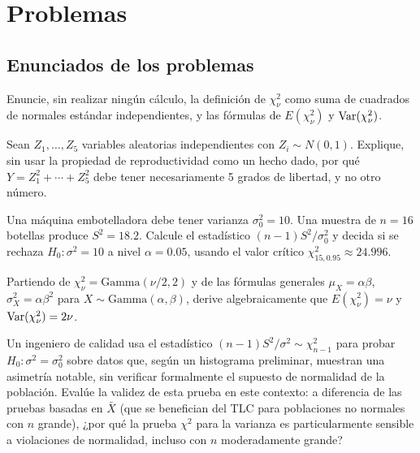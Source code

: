 \section*{Problemas}

\subsection*{Enunciados de los problemas}

\begin{problema}
	\label{prob:0d114e5}
	Enuncie, sin realizar ningún cálculo, la definición de $\chi^2_\nu$ como suma de cuadrados de normales estándar independientes, y las fórmulas de $E(\chi^2_\nu)$ y $\operatorname{Var}(\chi^2_\nu)$.
\end{problema}

\begin{problema}
	\label{prob:66b286b}
	Sean $Z_1,\ldots,Z_5$ variables aleatorias independientes con $Z_i\sim N(0,1)$. Explique, sin usar la propiedad de reproductividad como un hecho dado, por qué $Y=Z_1^2+\cdots+Z_5^2$ debe tener necesariamente 5 grados de libertad, y no otro número.
\end{problema}

\begin{problema}
	\label{prob:94c69e2}
	Una máquina embotelladora debe tener varianza $\sigma_0^2=10$. Una muestra de $n=16$ botellas produce $S^2=18.2$. Calcule el estadístico $(n-1)S^2/\sigma_0^2$ y decida si se rechaza $H_0:\sigma^2=10$ a nivel $\alpha=0.05$, usando el valor crítico $\chi^2_{15,0.95}\approx24.996$.
\end{problema}

\begin{problema}
	\label{prob:b08d077}
	Partiendo de $\chi^2_\nu = \text{Gamma}(\nu/2,2)$ y de las fórmulas generales $\mu_X=\alpha\beta$, $\sigma_X^2=\alpha\beta^2$ para $X\sim\text{Gamma}(\alpha,\beta)$, derive algebraicamente que $E(\chi^2_\nu)=\nu$ y $\operatorname{Var}(\chi^2_\nu)=2\nu$.
\end{problema}

\begin{problema}
	\label{prob:db05590}
	Un ingeniero de calidad usa el estadístico $(n-1)S^2/\sigma^2 \sim \chi^2_{n-1}$ para probar $H_0:\sigma^2=\sigma_0^2$ sobre datos que, según un histograma preliminar, muestran una asimetría notable, sin verificar formalmente el supuesto de normalidad de la población. Evalúe la validez de esta prueba en este contexto: a diferencia de las pruebas basadas en $\bar X$ (que se benefician del TLC para poblaciones no normales con $n$ grande), ¿por qué la prueba $\chi^2$ para la varianza es particularmente sensible a violaciones de normalidad, incluso con $n$ moderadamente grande?
\end{problema}

